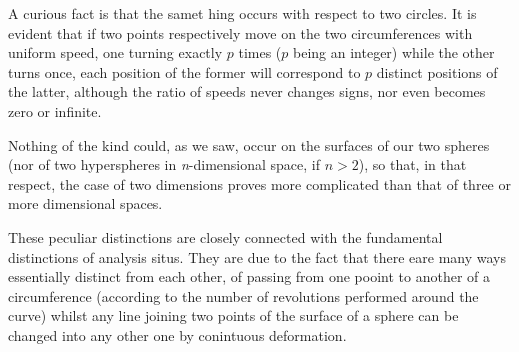 \documentclass[12pt,oneside]{book}
\begin{document}

A curious fact is that the samet hing occurs with respect to two circles. It is evident that if two points respectively move on the two circumferences with uniform speed, one turning exactly $p$ times ($p$ being an integer) while the other turns once, each position of the former will correspond to $p$ distinct positions of the latter, although the ratio of speeds never changes signs, nor even becomes zero or infinite. \par

Nothing of the kind could, as we saw, occur on the surfaces of our two spheres (nor of two hyperspheres in \textit{n}-dimensional space, if $n>2$), so that, in that respect, the case of two dimensions proves more complicated than that of three or more dimensional spaces. \par

These peculiar distinctions are closely connected with the fundamental distinctions of analysis situs. They are due to the fact that there eare many ways essentially distinct from each other, of passing from one pooint to another of a circumference (according to the number of revolutions performed around the curve) whilst any line joining two points of the surface of a sphere can be changed into any other one by conintuous deformation. \par
\end{document}
